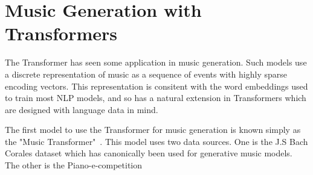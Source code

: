 \section{Music Generation with Transformers}
The Transformer has seen some application in music generation. Such models use a discrete representation of music as a sequence of events with highly sparse encoding vectors. This representation is consitent with the word embeddings used to train most NLP models, and so has a natural extension in Transformers which are designed with language data in mind. 

The first model to use the Transformer for music generation is known simply as the "Music Transformer"~\cite{huang2018music}. This model uses two data sources. One is the J.S Bach Corales dataset which has canonically been used for generative music models. The other is the Piano-e-competition 
